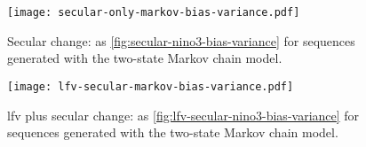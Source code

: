 \documentclass[
]{agujournal2018}
\begin{document}
\begin{figure}
  \centering
  \texttt{[image: secular-only-markov-bias-variance.pdf]}
  \caption{
    Secular change: as \cref{fig:secular-nino3-bias-variance} for sequences generated with the two-state Markov chain model.
  }\label{fig:secular-only-markov-bias-variance}
\end{figure}

\begin{figure}
  \centering
  \texttt{[image: lfv-secular-markov-bias-variance.pdf]}
  \caption{
    \Gls{lfv} plus secular change: as \cref{fig:lfv-secular-nino3-bias-variance} for sequences generated with the two-state Markov chain model.
  }\label{fig:lfv-secular-markov-bias-variance}
\end{figure}
\end{document}
